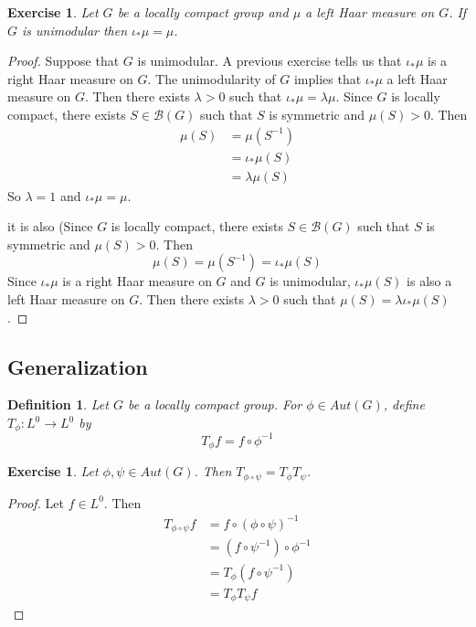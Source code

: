 \documentclass[12pt]{amsart}
\newtheorem{defn}[thm]{Definition}
\newtheorem{ex}[thm]{Exercise}
\newcommand{\lam}{\lambda}
\newcommand{\MB}{\mathcal{B}}
\begin{document}
	\begin{ex}
		Let $G$ be a locally compact group and $\mu$ a left Haar measure on $G$. If $G$ is unimodular then $\iota_*\mu = \mu$.
	\end{ex}

	\begin{proof}
		Suppose that $G$ is unimodular. A previous exercise tells us that $\iota_*\mu$ is a right Haar measure on $G$. The unimodularity of $G$ implies that $\iota_*\mu$ a left Haar measure on $G$. Then there exists $\lam >0$ such that $\iota_*\mu = \lam \mu$. Since $G$ is locally compact, there exists $S \in \MB(G)$ such that $S$ is symmetric and $\mu(S) > 0$. Then 
		\begin{align*}
			\mu(S) 
			& = \mu(S^{-1}) \\
			& = \iota_*\mu(S) \\
			& = \lam \mu(S) 
		\end{align*}	
		So $\lam = 1$ and $\iota_*\mu = \mu$.

		it is also (Since $G$ is locally compact, there exists $S \in \MB(G)$ such that $S$ is symmetric and $\mu(S) > 0$. Then 
		$$\mu(S) = \mu(S^{-1}) = \iota_*\mu(S)$$ Since $\iota_*\mu$ is a right Haar measure on $G$ and $G$ is unimodular, $\iota_*\mu(S)$ is also a left Haar measure on $G$. Then there exists $\lam > 0$ such that $\mu(S) = \lam\iota_*\mu(S)$.
	\end{proof}




	\newpage
	
	\subsection{Generalization}
	
	\begin{defn}
		Let $G$ be a locally compact group. For $\phi \in Aut(G)$, define $T_{\phi} : L^0 \rightarrow L^0$ by $$T_{\phi}f = f \circ \phi^{-1}$$ 
	\end{defn}

	\begin{ex}
		Let $\phi, \psi \in Aut(G)$. Then $T_{\phi  \circ \psi} = T_{\phi}T_{\psi}$. 
	\end{ex}

	\begin{proof}
		Let $f \in L^0$. Then 
		\begin{align*}
			T_{\phi \circ \psi} f 
			& = f \circ ({\phi \circ \psi})^{-1} \\ 
			& = (f \circ \psi^{-1}) \circ \phi^{-1} \\
			& = T_{\phi} (f \circ  \psi^{-1}) \\
			& = T_{\phi} T_{\psi} f  
		\end{align*}
	\end{proof}
\end{document}
